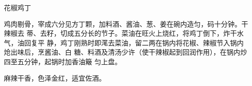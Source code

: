%
%
%
%
%
%
%
\begin{recipe}{花椒鸡丁}

\ingredients


\preparation

鸡肉剔骨，宰成六分见方丁颗，加料酒、酱油、葱、姜在碗内造匀，码十分钟。干辣椒去
蒂、去籽，切成五分长的节子。菜油在旺火上烧红，将鸡丁倒下，炸干水气，油回复平
静，鸡丁刚熟时即滗去菜油，留二两在锅内将花椒、辣椒节入锅内炝出味后，烹酱油、白
糖、料酒及清汤少许（使干辣椒起到回润作用），在锅内炒四至五分钟，起锅时加香油簸
匀上盘。

\features

麻辣干香，色泽金红，适宜佐酒。

\end{recipe}

